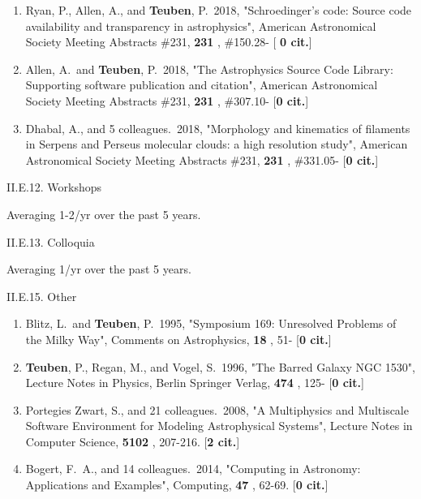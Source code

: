 \documentclass[11pt,letterpaper]{article}
\newcommand{\rsquo}{'}
\begin{document}
\begin{enumerate}[resume,label=\textbf{\arabic*}.]
\item  
Ryan, P., Allen, A., and {\bf Teuben}, P.\  2018,  "Schroedinger{\rsquo}s code: 
Source code availability and transparency in astrophysics", American 
Astronomical Society Meeting Abstracts \#231,  {\bf 231} , \#150.28- [{\bf 
0 cit.}] 

\item  
Allen, A.~and {\bf Teuben}, P.\  2018,  "The Astrophysics Source Code Library: 
Supporting software publication and citation", American Astronomical 
Society Meeting Abstracts \#231,  {\bf 231} , \#307.10- [{\bf 0 cit.}]

\item  
Dhabal, A., and 5 colleagues.\  2018,  "Morphology and kinematics of 
filaments in Serpens and Perseus molecular clouds: a high resolution 
study", American Astronomical Society Meeting Abstracts \#231,  {\bf 231} , 
\#331.05- [{\bf 0 cit.}] 

  
\end{enumerate}





II.E.12. Workshops

Averaging 1-2/yr over the past 5 years.

II.E.13. Colloquia

Averaging 1/yr over the past 5 years.


II.E.15. Other

\begin{enumerate}[resume,label=\textbf{\arabic*}.]

\item  
Blitz, L.~and {\bf Teuben}, P.\  1995,  "Symposium 169: Unresolved Problems of 
the Milky Way", Comments on Astrophysics,  {\bf 18} , 51- [{\bf 0 cit.}] 

\item  
{\bf Teuben}, P., Regan, M., and Vogel, S.\  1996,  "The Barred Galaxy NGC 
1530", Lecture Notes in Physics, Berlin Springer Verlag,  {\bf 474} , 125- 
[{\bf 0 cit.}] 

\item  
Portegies Zwart, S., and 21 colleagues.\  2008,  "A Multiphysics and 
Multiscale Software Environment for Modeling Astrophysical Systems", 
Lecture Notes in Computer Science,  {\bf 5102} , 207-216.  [{\bf 2 cit.}] 

\item  
Bogert, F.~A., and 14 colleagues.\  2014,  "Computing in Astronomy: 
Applications and Examples", Computing,  {\bf 47} , 62-69.  [{\bf 0 cit.}] 


\end{enumerate}
\end{document}
